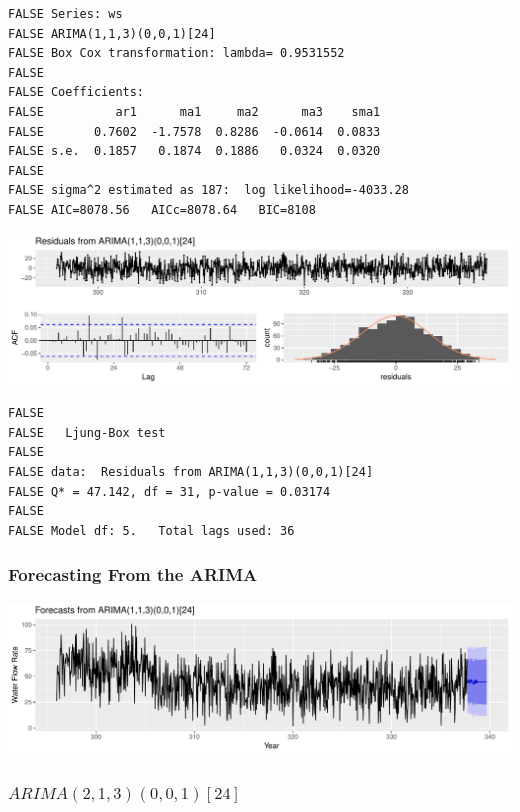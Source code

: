 \documentclass[openany]{book}
\begin{document}
\begin{verbatim}
FALSE Series: ws 
FALSE ARIMA(1,1,3)(0,0,1)[24] 
FALSE Box Cox transformation: lambda= 0.9531552 
FALSE 
FALSE Coefficients:
FALSE          ar1      ma1     ma2      ma3    sma1
FALSE       0.7602  -1.7578  0.8286  -0.0614  0.0833
FALSE s.e.  0.1857   0.1874  0.1886   0.0324  0.0320
FALSE 
FALSE sigma^2 estimated as 187:  log likelihood=-4033.28
FALSE AIC=8078.56   AICc=8078.64   BIC=8108
\end{verbatim}

\includegraphics{Part-C-BP_files/figure-latex/unnamed-chunk-9-1.pdf}

\begin{verbatim}
FALSE 
FALSE   Ljung-Box test
FALSE 
FALSE data:  Residuals from ARIMA(1,1,3)(0,0,1)[24]
FALSE Q* = 47.142, df = 31, p-value = 0.03174
FALSE 
FALSE Model df: 5.   Total lags used: 36
\end{verbatim}

\hypertarget{forecasting-from-the-arima}{%
\subsubsection{Forecasting From the
ARIMA}\label{forecasting-from-the-arima}}

\includegraphics{Part-C-BP_files/figure-latex/unnamed-chunk-10-1.pdf}

\hypertarget{arima21300124}{%
\subsubsection{\texorpdfstring{\(ARIMA(2,1,3)(0,0,1)[24]\)}{ARIMA(2,1,3)(0,0,1){[}24{]}}}\label{arima21300124}}
\end{document}
